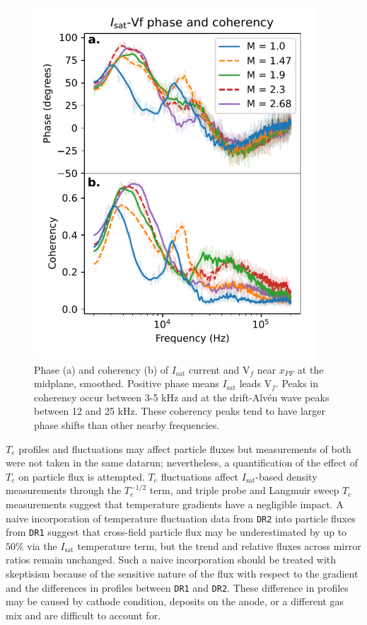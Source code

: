 \begin{figure}
    \centering
    \includegraphics[width=300pt]{figures/fig9.pdf}
    \caption[Phase and coherency of $I_\text{sat}$ current and V$_f$ near $x_{PF}$]{Phase (a) and coherency (b) of $I_\text{sat}$ current and V$_f$ near $x_{PF}$ at the midplane, smoothed. Positive phase means $I_\text{sat}$ leads V$_f$. Peaks in coherency occur between 3-5 kHz and at the drift-Alv\'en wave peaks between 12 and 25 kHz. These coherency peaks tend to have larger phase shifts than other nearby frequencies. }
    \label{fig:isat-Vf_phase}
\end{figure}

$T_e$ profiles and fluctuations may affect particle fluxes but measurements of both were not taken in the same datarun; nevertheless, a quantification of the effect of $T_e$ on particle flux is attempted.
$T_e$ fluctuations affect $I_\text{sat}$-based density measurements through the $T_e^{-1/2}$ term, and triple probe and Langmuir sweep $T_e$ measurements suggest that temperature gradients have a negligible impact. A naive incorporation of temperature fluctuation data from \texttt{DR2} into particle fluxes from \texttt{DR1} suggest that cross-field particle flux may be underestimated by up to $50\%$ via the $I_\text{sat}$ temperature term, but the trend and relative fluxes across mirror ratios remain unchanged. Such a naive incorporation should be treated with skeptisism because of the sensitive nature of the flux with respect to the gradient and the differences in profiles between \texttt{DR1} and \texttt{DR2}. These difference in profiles may be caused by cathode condition, deposits on the anode, or a different gas mix and are difficult to account for.

